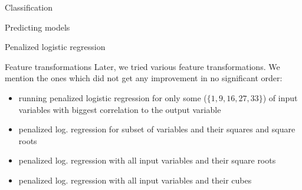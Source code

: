 \documentclass{article}
\begin{document}
\begin{section}{Classification}
\begin{subsection}{Predicting models}
\begin{subsubsection}{Penalized logistic regression}
\begin{figure}[!t]
\hfill
{}
\caption{}
\end{figure}

\begin{subsubsection}{Feature transformations}
Later, we tried various feature transformations. We mention the ones which did not get any improvement in no significant order:
\begin{itemize}

\item running penalized logistic regression for only some ($\{1, 9, 16, 27, 33\}$) of input variables with biggest correlation to the output variable
\item penalized log. regression for subset of variables and their squares and square roots
\item penalized log. regression with all input variables and their square roots
\item penalized log. regression with all input variables and their cubes
\end{itemize}


\end{subsubsection}
\end{subsubsection}
\end{subsection}
\end{section}
\end{document}
